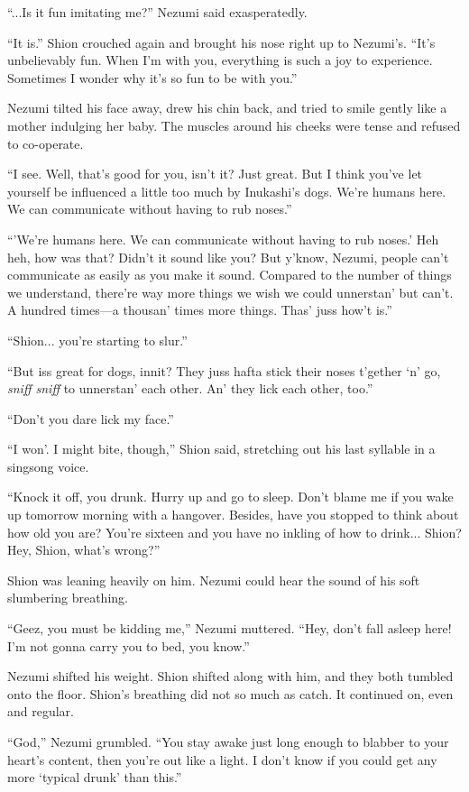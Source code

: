 ``...Is it fun imitating me?'' Nezumi said exasperatedly.

``It is.'' Shion crouched again and brought his nose right up to
Nezumi's. ``It's unbelievably fun. When I'm with you, everything is such
a joy to experience. Sometimes I wonder why it's so fun to be with
you.''

Nezumi tilted his face away, drew his chin back, and tried to smile
gently like a mother indulging her baby. The muscles around his cheeks
were tense and refused to co-operate.

``I see. Well, that's good for you, isn't it? Just great. But I think
you've let yourself be influenced a little too much by Inukashi's dogs.
We're humans here. We can communicate without having to rub noses.''

``'We're humans here. We can communicate without having to rub noses.'
Heh heh, how was that? Didn't it sound like you? But y'know, Nezumi,
people can't communicate as easily as you make it sound. Compared to the
number of things we understand, there're way more things we wish we
could unnerstan' but can't. A hundred times---a thousan' times more
things. Thas' juss how't is.''

``Shion... you're starting to slur.''

``But iss great for dogs, innit? They juss hafta stick their noses
t'gether `n' go, \emph{sniff sniff} to unnerstan' each other. An' they lick
each other, too.''

``Don't you dare lick my face.''

``I won'. I might bite, though,'' Shion said, stretching out his last
syllable in a singsong voice.

``Knock it off, you drunk. Hurry up and go to sleep. Don't blame me if
you wake up tomorrow morning with a hangover. Besides, have you stopped
to think about how old you are? You're sixteen and you have no inkling
of how to drink... Shion? Hey, Shion, what's wrong?''

Shion was leaning heavily on him. Nezumi could hear the sound of his
soft slumbering breathing.

``Geez, you must be kidding me,'' Nezumi muttered. ``Hey, don't fall
asleep here! I'm not gonna carry you to bed, you know.''

Nezumi shifted his weight. Shion shifted along with him, and they both
tumbled onto the floor. Shion's breathing did not so much as catch. It
continued on, even and regular.

``God,'' Nezumi grumbled. ``You stay awake just long enough to blabber
to your heart's content, then you're out like a light. I don't know if
you could get any more `typical drunk' than this.''

